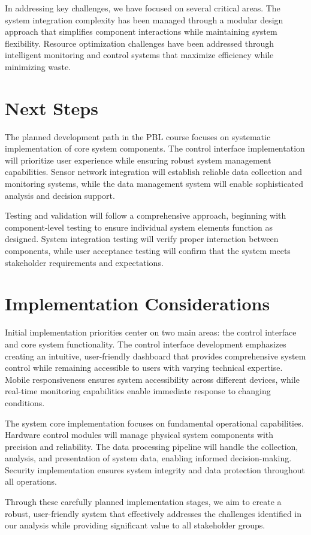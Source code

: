 In addressing key challenges, we have focused on several critical areas. The system integration complexity has been managed through a modular design approach that simplifies component interactions while maintaining system flexibility. Resource optimization challenges have been addressed through intelligent monitoring and control systems that maximize efficiency while minimizing waste.

\section*{Next Steps}
The planned development path in the PBL course focuses on systematic implementation of core system components. The control interface implementation will prioritize user experience while ensuring robust system management capabilities. Sensor network integration will establish reliable data collection and monitoring systems, while the data management system will enable sophisticated analysis and decision support.

Testing and validation will follow a comprehensive approach, beginning with component-level testing to ensure individual system elements function as designed. System integration testing will verify proper interaction between components, while user acceptance testing will confirm that the system meets stakeholder requirements and expectations.

\section*{Implementation Considerations}
Initial implementation priorities center on two main areas: the control interface and core system functionality. The control interface development emphasizes creating an intuitive, user-friendly dashboard that provides comprehensive system control while remaining accessible to users with varying technical expertise. Mobile responsiveness ensures system accessibility across different devices, while real-time monitoring capabilities enable immediate response to changing conditions.

The system core implementation focuses on fundamental operational capabilities. Hardware control modules will manage physical system components with precision and reliability. The data processing pipeline will handle the collection, analysis, and presentation of system data, enabling informed decision-making. Security implementation ensures system integrity and data protection throughout all operations.

Through these carefully planned implementation stages, we aim to create a robust, user-friendly system that effectively addresses the challenges identified in our analysis while providing significant value to all stakeholder groups.
